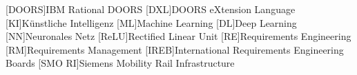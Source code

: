 
\begin{acronym}
	[DOORS]{IBM Rational DOORS}
	[DXL]{DOORS eXtension Language}
	[KI]{Künstliche Intelligenz}
	[ML]{Machine Learning}
	[DL]{Deep Learning}
	[NN]{Neuronales Netz}
	[ReLU]{Rectified Linear Unit}
	[RE]{Requirements Engineering}
	[RM]{Requirements Management}
	[IREB]{International Requirements Engineering Boards}
	[SMO RI]{Siemens Mobility Rail Infrastructure}
\end{acronym}


